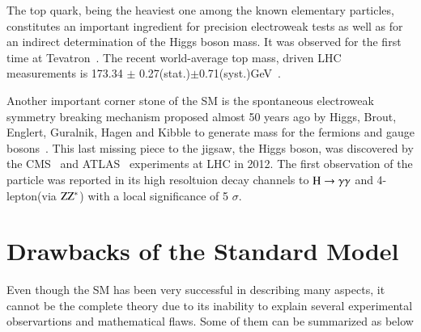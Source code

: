 The top quark, being the heaviest one among the known elementary particles, constitutes an important ingredient for precision electroweak tests as well as for an indirect determination of the Higgs boson mass. It was observed for the first time at Tevatron~\cite{topquark}. The recent world-average top mass, driven  LHC measurements is 173.34 $\pm$ 0.27(stat.)$\pm$0.71(syst.)GeV~\cite{TopQuarkMass}.

Another important corner stone of the SM is the spontaneous electroweak symmetry breaking mechanism proposed almost 50 years ago by Higgs, Brout, Englert,  Guralnik, Hagen and Kibble to generate mass for the  fermions and gauge bosons~\cite{higgs}. This last missing piece to the jigsaw, the Higgs boson, was discovered  by the  CMS~\cite{cms-higgs} and ATLAS~\cite{atlas-higgs} experiments at LHC in 2012. The first observation of the particle was reported in  its high resoltuion decay channels to $\rm H \rightarrow \gamma\gamma$ and 4-lepton(via $\rm ZZ^{*}$) with a local significance of 5 $\sigma$. 



\section {Drawbacks of the Standard Model}

Even though the SM has been very successful in describing many aspects, it cannot be the complete theory due to its inability to explain several experimental observartions and mathematical flaws. Some of them can be summarized as below

